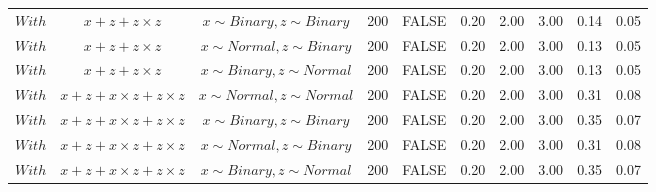 \begin{table}[ht]
{\begin{tabular}{lccccccccc}
  $With$ & $\textit{x} + \textit{z} + \textit{z} \times \textit{z}$ & $\textit{x} \sim Binary, \textit{z} \sim Binary$ & 200 & FALSE & 0.20 & 2.00 & 3.00 & 0.14 & 0.05 \\ 
  $With$ & $\textit{x} + \textit{z} + \textit{z} \times \textit{z}$ & $\textit{x} \sim Normal, \textit{z} \sim Binary$ & 200 & FALSE & 0.20 & 2.00 & 3.00 & 0.13 & 0.05 \\ 
  $With$ & $\textit{x} + \textit{z} + \textit{z} \times \textit{z}$ & $\textit{x} \sim Binary, \textit{z} \sim Normal$ & 200 & FALSE & 0.20 & 2.00 & 3.00 & 0.13 & 0.05 \\ 
  $With$ & $\textit{x} + \textit{z} + \textit{x} \times \textit{z} + \textit{z} \times \textit{z}$ & $\textit{x} \sim Normal , \textit{z} \sim Normal$ & 200 & FALSE & 0.20 & 2.00 & 3.00 & 0.31 & 0.08 \\ 
  $With$ & $\textit{x} + \textit{z} + \textit{x} \times \textit{z} + \textit{z} \times \textit{z}$ & $\textit{x} \sim Binary, \textit{z} \sim Binary$ & 200 & FALSE & 0.20 & 2.00 & 3.00 & 0.35 & 0.07 \\ 
  $With$ & $\textit{x} + \textit{z} + \textit{x} \times \textit{z} + \textit{z} \times \textit{z}$ & $\textit{x} \sim Normal, \textit{z} \sim Binary$ & 200 & FALSE & 0.20 & 2.00 & 3.00 & 0.31 & 0.08 \\ 
  $With$ & $\textit{x} + \textit{z} + \textit{x} \times \textit{z} + \textit{z} \times \textit{z}$ & $\textit{x} \sim Binary, \textit{z} \sim Normal$ & 200 & FALSE & 0.20 & 2.00 & 3.00 & 0.35 & 0.07 \\ 
   \hline
\end{tabular}
}
\end{table}
